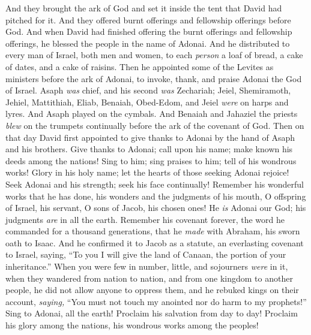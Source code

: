 \begin{biblechapter} %
 And they brought the ark of God and set it inside the tent that David had pitched for it. And they offered burnt offerings and fellowship offerings before God.
\verse And when David had finished offering the burnt offerings and fellowship offerings, he blessed the people in the name of Adonai.
\verse And he distributed to every man of Israel, both men and women, to each \textit{person} a loaf of bread, a cake of dates, and a cake of raisins.
\verse Then he appointed some of the Levites as ministers before the ark of Adonai, to invoke, thank, and praise Adonai the God of Israel.
\verse Asaph \textit{was} chief, and his second \textit{was} Zechariah; Jeiel, Shemiramoth, Jehiel, Mattithiah, Eliab, Benaiah, Obed-Edom, and Jeiel \textit{were} on harps and lyres. And Asaph played on the cymbals.
\verse And Benaiah and Jahaziel the priests \textit{blew} on the trumpets continually before the ark of the covenant of God.
\verse Then on that day David first appointed to give thanks to Adonai by the hand of Asaph and his brothers.
 Give thanks to Adonai; call upon his name; 
make known his deeds among the nations!
\verse Sing to him; sing praises to him; 
tell of his wondrous works!
\verse Glory in his holy name; 
let the hearts of those seeking Adonai rejoice!
\verse Seek Adonai and his strength; 
seek his face continually!
\verse Remember his wonderful works that he has done, 
his wonders and the judgments of his mouth,
\verse O offspring of Israel, his servant, 
O sons of Jacob, his chosen ones!
\verse He \textit{is} Adonai our God; 
his judgments \textit{are} in all the earth.
\verse Remember his covenant forever, 
the word he commanded for a thousand generations,
\verse that he \textit{made} with Abraham, 
his sworn oath to Isaac.
\verse And he confirmed it to Jacob as a statute, 
an everlasting covenant to Israel,
\verse saying, “To you I will give the land of Canaan, 
the portion of your inheritance.”
\verse When you were few in number, little, 
and sojourners \textit{were} in it,
\verse when they wandered from nation to nation, 
and from one kingdom to another people,
\verse he did not allow anyone to oppress them, 
and he rebuked kings on their account,
\verse \textit{saying,} “You must not touch my anointed 
nor do harm to my prophets!”
\verse Sing to Adonai, all the earth! 
Proclaim his salvation from day to day!
\verse Proclaim his glory among the nations, 
his wondrous works among the peoples!

\end{biblechapter}
